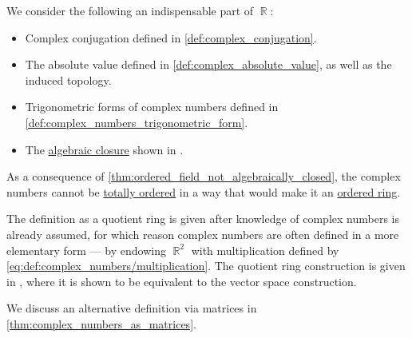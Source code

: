 \begin{comments}
  \item We consider the following an indispensable part of \( \BbbR \):
  \begin{itemize}
    \item Complex conjugation defined in \cref{def:complex_conjugation}.
    \item The absolute value defined in \cref{def:complex_absolute_value}, as well as the induced topology.
    \item Trigonometric forms of complex numbers defined in \cref{def:complex_numbers_trigonometric_form}.
    \item The \hyperref[def:algebraically_closed_field]{algebraic closure} shown in .
  \end{itemize}

  \item As a consequence of \cref{thm:ordered_field_not_algebraically_closed}, the complex numbers cannot be \hyperref[def:totally_ordered_set]{totally ordered} in a way that would make it an \hyperref[def:ordered_semiring]{ordered ring}.

  \item The definition as a quotient ring is given after knowledge of complex numbers is already assumed, for which reason complex numbers are often defined in a more elementary form --- by endowing \( \BbbR^2 \) with multiplication defined by \eqref{eq:def:complex_numbers/multiplication}. The quotient ring construction is given in , where it is shown to be equivalent to the vector space construction.

  We discuss an alternative definition via matrices in \cref{thm:complex_numbers_as_matrices}.
\end{comments}

